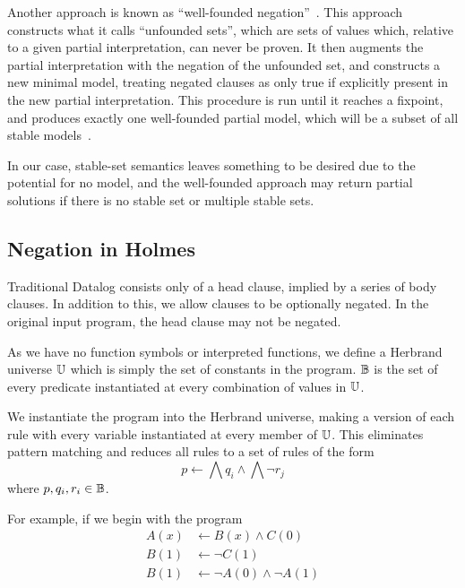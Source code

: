 Another approach is known as ``well-founded negation''~\cite{wellfounded}.
This approach constructs what it calls ``unfounded sets'', which are sets of values which, relative to a given partial interpretation, can never be proven.
It then augments the partial interpretation with the negation of the unfounded set, and constructs a new minimal model, treating negated clauses as only true if explicitly present in the new partial interpretation.
This procedure is run until it reaches a fixpoint, and produces exactly one well-founded partial model, which will be a subset of all stable models~\cite{wellfounded}.

In our case, stable-set semantics leaves something to be desired due to the potential for no model, and the well-founded approach may return partial solutions if there is no stable set or multiple stable sets.
\subsection{Negation in Holmes}
Traditional Datalog consists only of a head clause, implied by a series of body clauses.
In addition to this, we allow clauses to be optionally negated.
In the original input program, the head clause may not be negated.

As we have no function symbols or interpreted functions, we define a Herbrand universe $\mathbb{U}$ which is simply the set of constants in the program.
$\mathbb{B}$ is the set of every predicate instantiated at every combination of values in $\mathbb{U}$.

We instantiate the program into the Herbrand universe, making a version of each rule with every variable instantiated at every member of $\mathbb{U}$.
This eliminates pattern matching and reduces all rules to a set of rules of the form
\[
	p \leftarrow \bigwedge q_i \wedge \bigwedge \neg r_j
\]
where $p, q_i, r_i \in \mathbb{B}$.

For example, if we begin with the program
\begin{align*}
A(x) &\leftarrow B(x) \wedge C(0)\\
B(1) &\leftarrow \neg C(1)\\
B(1) &\leftarrow \neg A(0) \wedge \neg A(1)
\end{align*}

